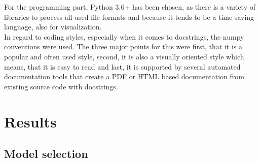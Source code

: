 For the programming part, Python 3.6+ has been chosen, as there is a variety of libraries to process all used file formats and because it tends to be a time saving language, also for visualization.\\

In regard to coding styles, especially when it comes to docstrings, the numpy conventions were used. The three major points for this were first, that it is a popular and often used style, second, it is also a visually oriented style which means, that it is easy to read and last, it is supported by several automated documentation tools that create a PDF or HTML based documentation from existing source code with docstrings.\\


\section{Results}
\label{sec:results}

\subsection*{Model selection}

